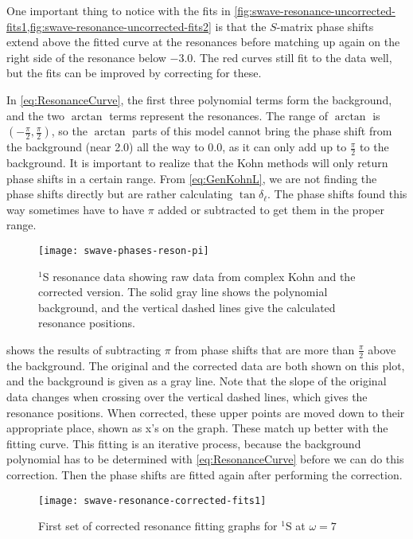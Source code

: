 \documentclass[Dissertation.tex]{subfiles}
\begin{document}
One important thing to notice with the fits in
\cref{fig:swave-resonance-uncorrected-fits1,fig:swave-resonance-uncorrected-fits2} is that the
$S$-matrix phase shifts extend above the fitted curve at the resonances before 
matching up again on the right side of the resonance below $-3.0$. The red 
curves still fit to the data well, but the fits can be improved by correcting 
for these. 

In \cref{eq:ResonanceCurve}, the first three polynomial terms form the 
background, and the two $\arctan$ terms represent the resonances. The range 
of $\arctan$ is $(-\frac{\pi}{2},\frac{\pi}{2})$, so the $\arctan$ parts of 
this model cannot bring the phase shift from the background (near 2.0) all 
the way to 0.0, as it can only add up to $\frac{\pi}{2}$ to the background. 
It is important to realize that the Kohn methods will only return phase 
shifts in a certain range. From \cref{eq:GenKohnL}, we are not finding the 
phase shifts directly but are rather calculating $\tan \delta_\ell$. The 
phase shifts found this way sometimes have to have $\pi$ added or subtracted 
to get them in the proper range.

\begin{figure}
	\centering
	\texttt{[image: swave-phases-reson-pi]}
	\caption[$^1$S resonance data showing correction]{$^1$S resonance data showing raw data from complex Kohn and the corrected version. The solid gray line shows the polynomial background, and the vertical dashed lines give the calculated resonance positions.}
	\label{fig:swave-phases-reson-pi}
\end{figure}

 shows the results of subtracting $\pi$ from 
phase shifts that are more than $\frac{\pi}{2}$ above the background. The 
original and the corrected data are both shown on this plot, and the 
background is given as a gray line. Note that the slope of the original data 
changes when crossing over the vertical dashed lines, which gives the 
resonance positions. When corrected, these upper points are moved down to 
their appropriate place, shown as x's on the graph. These match up better 
with the fitting curve. This fitting is an iterative process, because the 
background polynomial has to be determined with \cref{eq:ResonanceCurve} 
before we can do this correction. Then the phase shifts are fitted again 
after performing the correction.

\begin{figure}
	\centering
	\texttt{[image: swave-resonance-corrected-fits1]}
	\caption{First set of corrected resonance fitting graphs for $^1$S at $\omega = 7$}
	\label{fig:swave-resonance-corrected-fits1}
\end{figure}
\end{document}
